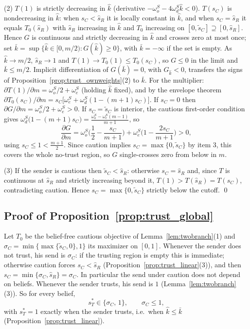 \documentclass[11pt]{article}
\theoremstyle{plain}
\theoremstyle{remark}
\begin{document}
(2) $T(1)$ is strictly decreasing in $\hat k$ (derivative $-\omega_o^S-4\omega_d^S\hat k<0$).  $T(s_C)$ is nondecreasing in $\hat k$: when $s_C<\hat s_R$ it is locally constant in $\hat k$, and when $s_C=\hat s_R$ it equals $T_0(\hat s_R)$ with $\hat s_R$ increasing in $\hat k$ and $T_0$ increasing on $[0,\tilde s_C]\supseteq[0,\hat s_R]$.  Hence $G$ is continuous and strictly decreasing in $\hat k$ and crosses zero at most once; set $\bar k=\sup\{\hat k\in[0,m/2):G(\hat k)\ge0\}$, with $\bar k=-\infty$ if the set is empty.  As $\hat k\to m/2$, $\hat s_R\to1$ and $T(1)\to T_0(1)\le T_0(s_C)$, so $G\le0$ in the limit and $\bar k\le m/2$.  Implicit differentiation of $G(\bar k)=0$, with $G_{\hat k}<0$, transfers the signs of Proposition~\ref{prop:trust_ownweights}(2) to $\bar k$.  For the multiplier: $\partial T(1)/\partial m=\omega_o^S/2+\omega_e^S$ (holding $\hat k$ fixed), and by the envelope theorem $\partial T_0(s_C)/\partial m=s_C\big[\omega_e^S+\omega_d^S(1-(m+1)s_C)\big]$.  If $s_C=0$ then $\partial G/\partial m=\omega_o^S/2+\omega_e^S>0$.  If $s_C=\tilde s_C$ is interior, the cautious first-order condition gives $\omega_d^S\big(1-(m+1)s_C\big)=\frac{\omega_o^S-\omega_e^S(m-1)}{m+1}$, so
\[
        \frac{\partial G}{\partial m}
        =
        \omega_o^S\Big(\frac12-\frac{s_C}{m+1}\Big)
        +\omega_e^S\Big(1-\frac{2s_C}{m+1}\Big)>0,
\]
using $s_C\le1<\tfrac{m+1}2$.  Since caution implies $s_C=\max\{0,\tilde s_C\}$ by item 3, this covers the whole no-trust region, so $G$ single-crosses zero from below in $m$.

(3) If the sender is cautious then $\tilde s_C<\hat s_R$: otherwise $s_C=\hat s_R$ and, since $T$ is continuous at $\hat s_R$ and strictly increasing beyond it, $T(1)>T(\hat s_R)=T(s_C)$, contradicting caution.  Hence $s_C=\max\{0,\tilde s_C\}$ strictly below the cutoff.
\qed

\subsection*{Proof of Proposition~\ref{prop:trust_global}}

Let $T_0$ be the belief-free cautious objective of Lemma~\ref{lem:twobranch}(1) and $\sigma_C=\min\{\max\{\tilde s_C,0\},1\}$ its maximizer on $[0,1]$.  Whenever the sender does not trust, his send is $\sigma_C$: if the trusting region is empty this is immediate; otherwise caution forces $s_C<\hat s_R$ (Proposition~\ref{prop:trust_linear}(3)), and then $s_C=\min\{\sigma_C,\hat s_R\}=\sigma_C$.  In particular the send under caution does not depend on beliefs.  Whenever the sender trusts, his send is $1$ (Lemma~\ref{lem:twobranch}(3)).  So for every belief,
\[
        s_T^\ast\in\{\sigma_C,\,1\},
        \qquad
        \sigma_C\le1,
\]
with $s_T^\ast=1$ exactly when the sender trusts, i.e.\ when $\hat k\le\bar k$ (Proposition~\ref{prop:trust_linear}).
\end{document}
